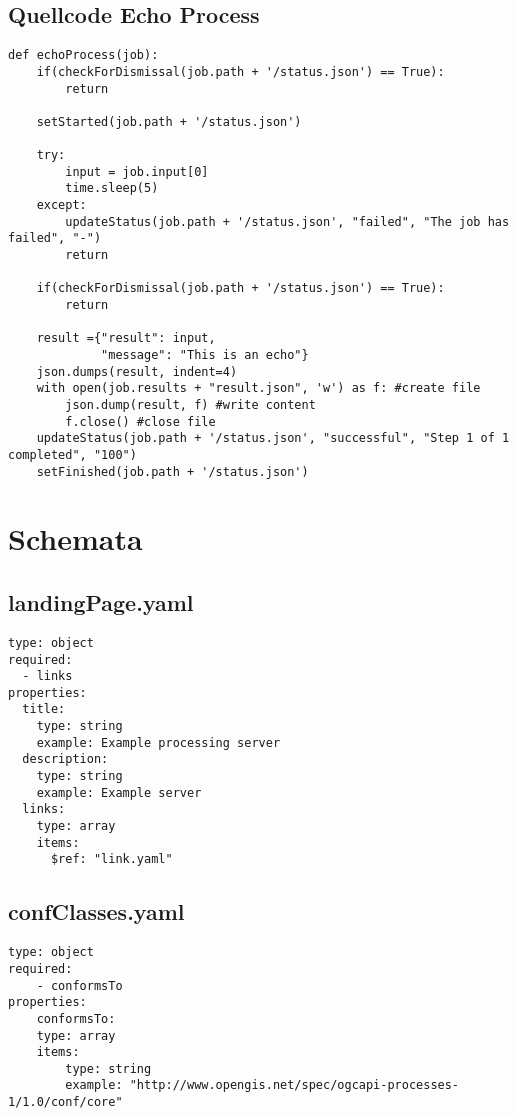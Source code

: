 \subsection{Quellcode Echo Process}
\begin{lstlisting}[caption={Echo Process}, style = Python]
def echoProcess(job):
    if(checkForDismissal(job.path + '/status.json') == True):
        return
    
    setStarted(job.path + '/status.json')
    
    try:
        input = job.input[0]
        time.sleep(5)
    except:
        updateStatus(job.path + '/status.json', "failed", "The job has failed", "-")
        return
    
    if(checkForDismissal(job.path + '/status.json') == True):
        return
    
    result ={"result": input,
             "message": "This is an echo"}
    json.dumps(result, indent=4)
    with open(job.results + "result.json", 'w') as f: #create file
        json.dump(result, f) #write content
        f.close() #close file
    updateStatus(job.path + '/status.json', "successful", "Step 1 of 1 completed", "100")
    setFinished(job.path + '/status.json')
\end{lstlisting}\label{appendixEchoProcess}  

\section{Schemata}
\renewcommand{\lstlistingname}{Schema}  
\subsection{landingPage.yaml}
\begin{lstlisting}[caption={landingPage.yaml}, style = JSON]
type: object
required:
  - links
properties:
  title:
    type: string
    example: Example processing server
  description:
    type: string
    example: Example server 
  links:
    type: array
    items:
      $ref: "link.yaml"
\end{lstlisting}\label{appendixlandngPageyaml}  

\subsection{confClasses.yaml}
\begin{lstlisting}[caption={confClasses.yaml}, style = JSON]
type: object
required:
    - conformsTo
properties:
    conformsTo:
    type: array
    items:
        type: string
        example: "http://www.opengis.net/spec/ogcapi-processes-1/1.0/conf/core"
\end{lstlisting}\label{appendixconfClassesyaml}  

